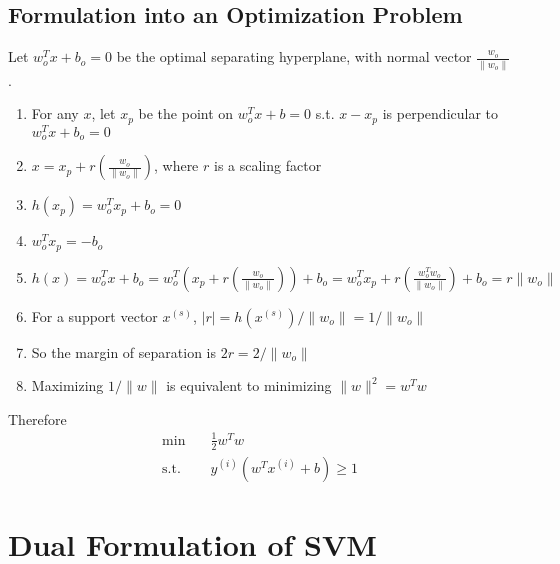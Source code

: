     \subsection{Formulation into an Optimization Problem}
        Let $w_o^Tx+b_o=0$ be the optimal separating hyperplane, with normal vector $\frac{w_o}{\|w_o\|}$.
        \begin{enumerate}
            \item For any $x$, let $x_p$ be the point on $w_o^Tx+b=0$ s.t. $x - x_p$ is perpendicular to $w_o^Tx+b_o=0$
            \item $x = x_p + r\left(\frac{w_o}{\|w_o\|}\right)$, where $r$ is a scaling factor
            \item $h(x_p) = w_o^Tx_p + b_o = 0$
            \item $w_o^Tx_p = -b_o$
            \item $h(x) = w_o^Tx + b_o = w_o^T\left(x_p + r\left(\frac{w_o}{\|w_o\|}\right)\right) + b_o = w_o^Tx_p + r\left(\frac{w_o^Tw_o}{\|w_o\|}\right) + b_o = r\|w_o\|$
            \item For a support vector $x^{(s)}$, $|r| = h(x^{(s)})/\|w_o\| = 1/\|w_o\|$
            \item So the margin of separation is $2r = 2/\|w_o\|$
            \item Maximizing $1/\|w\|$ is equivalent to minimizing $\|w\|^2 = w^Tw$
        \end{enumerate}
        Therefore
        \begin{align*}
            \min \quad &\frac{1}{2}w^Tw\\
            \text{s.t.} \quad & y^{(i)}(w^Tx^{(i)}+b) \ge 1
        \end{align*}


\section{Dual Formulation of SVM}
